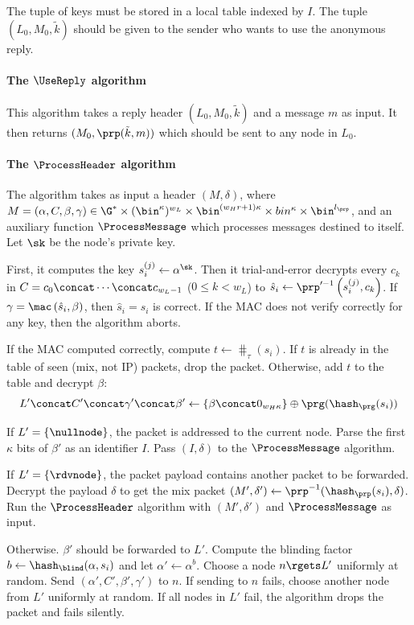 The tuple of keys must be stored in a local table indexed by \(I\).
The tuple \((L_0, M_0, \tilde k)\) should be given to the sender who wants to 
use the anonymous reply.

\paragraph*{The \(\UseReply\) algorithm}

This algorithm takes a reply header \((L_0, M_0, \tilde k)\) and a message 
\(m\) as input.
It then returns \((M_0, \prp(\tilde k, m))\) which should be sent to any node 
in \(L_0\).

\paragraph*{The \(\ProcessHeader\) algorithm}

The algorithm takes as input a header \((M, \delta)\), where \(M = (\alpha, C, 
  \beta, \gamma)\in \G^*\times (\bin^\kappa)^{w_L} \times \bin^{(w_H 
    r+1)\kappa}\times bin^\kappa\times \bin^{l_\prp}\), and an auxiliary 
function \(\ProcessMessage\) which processes messages destined to itself.
Let \(\sk\) be the node's private key.

First, it computes the key \(s_i^{(j)}\gets \alpha^\sk\).
Then it trial-and-error decrypts every \(c_k\) in \(C = c_0\concat 
  \dotsb\concat c_{w_L-1}\) (\(0\leq k< w_L\)) to \(\hat s_i\gets \prp^{\prime 
    -1}\left(s_i^{(j)}, c_k\right)\).
If \(\gamma = \mac\left(\hat s_i, \beta\right)\), then \(\hat s_i = s_i\) is 
correct.
If the \ac{MAC} does not verify correctly for any key, then the algorithm 
aborts.

If the \ac{MAC} computed correctly, compute \(t\gets \hash_\tau(s_i)\).
If \(t\) is already in the table of seen (mix, not IP) packets, drop the packet.
Otherwise, add \(t\) to the table and decrypt \(\beta\):
\begin{equation*}
  L'\concat C'\concat \gamma'\concat \beta'\gets \{\beta\concat 0_{w_H 
    \kappa}\}
  \oplus \prg(\hash_\prg(s_i))
\end{equation*}

If \(L' = \{\nullnode\}\), the packet is addressed to the current node.
Parse the first \(\kappa\) bits of \(\beta'\) as an identifier \(I\).
Pass \((I, \delta)\) to the \(\ProcessMessage\) algorithm.

If \(L' = \{\rdvnode\}\), the packet payload contains another \Sphinxes packet 
to be forwarded.
Decrypt the payload \(\delta\) to get the mix packet \((M', \delta')\gets 
  \prp^{-1}(\hash_\prp(s_i), \delta)\).
Run the \(\ProcessHeader\) algorithm with \((M', \delta')\) and 
\(\ProcessMessage\) as input.

Otherwise. \(\beta'\) should be forwarded to \(L'\).
Compute the blinding factor \(b\gets \hash_\blind(\alpha, s_i)\) and let 
\(\alpha'\gets \alpha^b\).
Choose a node \(n\rgets L'\) uniformly at random.
Send \((\alpha', C', \beta', \gamma')\) to \(n\).
If sending to \(n\) fails, choose another node from \(L'\) uniformly at random.
If all nodes in \(L'\) fail, the algorithm drops the packet and fails silently.

